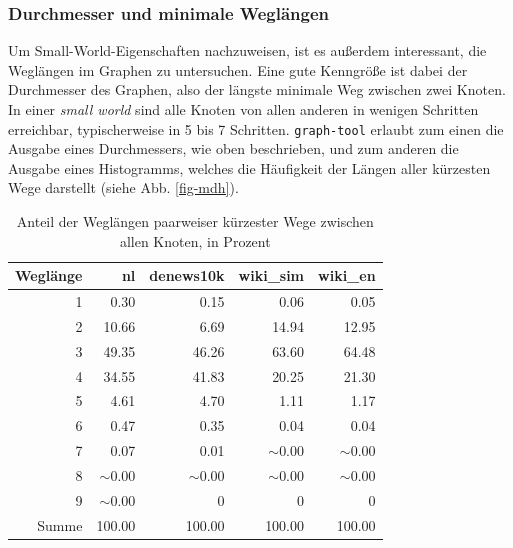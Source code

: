 \documentclass[11pt, a4paper]{article}
\begin{document}

\subsubsection{Durchmesser und minimale Wegl\"angen}
Um Small-World-Eigenschaften nachzuweisen, ist es außerdem interessant, die
Weglängen im Graphen zu untersuchen. Eine gute Kenngröße ist dabei der Durchmesser
des Graphen, also der längste minimale Weg zwischen zwei Knoten. In einer
\emph{small world} sind alle Knoten von allen anderen in wenigen Schritten
erreichbar, typischerweise in 5 bis 7 Schritten. \texttt{graph-tool}
erlaubt zum einen die Ausgabe eines Durchmessers, wie oben beschrieben, und zum
anderen die Ausgabe eines Histogramms, welches die Häufigkeit der Längen aller
kürzesten Wege darstellt (siehe Abb. \ref{fig-mdh}).

\begin{table}[ht]
    \centering
    \begin{tabular}{rrrrr}
      \toprule
    Weglänge & nl & denews10k & wiki\_sim & wiki\_en \\ 
      \midrule
      1 & 0.30      & 0.15      & 0.06      & 0.05 \\ 
      2 & 10.66     & 6.69      & 14.94     & 12.95 \\ 
      3 & 49.35     & 46.26     & 63.60     & 64.48 \\ 
      4 & 34.55     & 41.83     & 20.25     & 21.30 \\ 
      5 & 4.61      & 4.70      & 1.11      & 1.17 \\ 
      6 & 0.47      & 0.35      & 0.04      & 0.04 \\ 
      7 & 0.07      & 0.01      & $\sim$0.00  & $\sim$0.00 \\ 
      8 & $\sim$0.00  & $\sim$0.00  & $\sim$0.00  & $\sim$0.00 \\ 
      9 & $\sim$0.00  & 0         & 0         & 0 \\ 
      Summe & 100.00  & 100.00    & 100.00    & 100.00 \\ 
       \bottomrule
    \end{tabular}
    \caption{Anteil der Weglängen paarweiser kürzester Wege zwischen allen Knoten, in Prozent}
    \label{md-perc}
\end{table}
\end{document}

